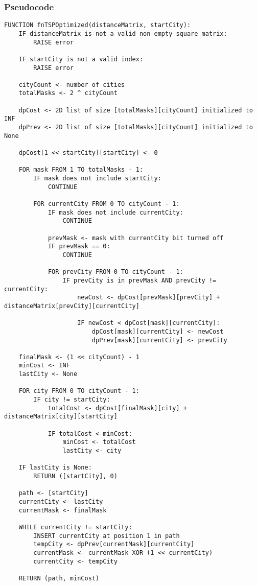 \documentclass{article}
\begin{document}
\subsubsection*{Pseudocode}
\begin{lstlisting}
FUNCTION fnTSPOptimized(distanceMatrix, startCity):
    IF distanceMatrix is not a valid non-empty square matrix:
        RAISE error

    IF startCity is not a valid index:
        RAISE error

    cityCount <- number of cities
    totalMasks <- 2 ^ cityCount

    dpCost <- 2D list of size [totalMasks][cityCount] initialized to INF
    dpPrev <- 2D list of size [totalMasks][cityCount] initialized to None

    dpCost[1 << startCity][startCity] <- 0

    FOR mask FROM 1 TO totalMasks - 1:
        IF mask does not include startCity:
            CONTINUE

        FOR currentCity FROM 0 TO cityCount - 1:
            IF mask does not include currentCity:
                CONTINUE

            prevMask <- mask with currentCity bit turned off
            IF prevMask == 0:
                CONTINUE

            FOR prevCity FROM 0 TO cityCount - 1:
                IF prevCity is in prevMask AND prevCity != currentCity:
                    newCost <- dpCost[prevMask][prevCity] + distanceMatrix[prevCity][currentCity]

                    IF newCost < dpCost[mask][currentCity]:
                        dpCost[mask][currentCity] <- newCost
                        dpPrev[mask][currentCity] <- prevCity

    finalMask <- (1 << cityCount) - 1
    minCost <- INF
    lastCity <- None

    FOR city FROM 0 TO cityCount - 1:
        IF city != startCity:
            totalCost <- dpCost[finalMask][city] + distanceMatrix[city][startCity]

            IF totalCost < minCost:
                minCost <- totalCost
                lastCity <- city

    IF lastCity is None:
        RETURN ([startCity], 0)

    path <- [startCity]
    currentCity <- lastCity
    currentMask <- finalMask

    WHILE currentCity != startCity:
        INSERT currentCity at position 1 in path
        tempCity <- dpPrev[currentMask][currentCity]
        currentMask <- currentMask XOR (1 << currentCity)
        currentCity <- tempCity

    RETURN (path, minCost)
\end{lstlisting}
\end{document}
